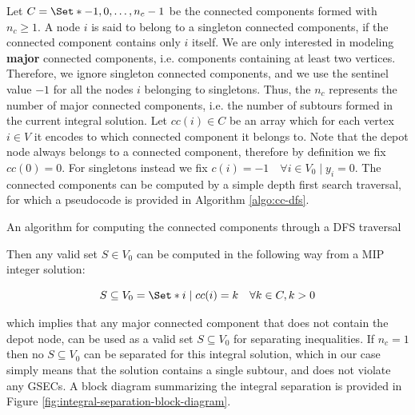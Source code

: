 Let $C = \Set*{-1, 0, \dots, n_c - 1}$ be the connected components formed with $n_c \ge 1$.
A node $i$ is said to belong to a singleton connected components, if the connected component contains only $i$ itself.
We are only interested in modeling \textbf{major} connected components, i.e. components containing at least two vertices.
Therefore, we ignore singleton connected components, and we use the sentinel value $-1$ for all the nodes $i$ belonging to singletons.
Thus, the $n_c$ represents the number of major connected components, i.e. the number of subtours formed in the current integral solution.
Let $cc(i) \in C$ be an array which for each vertex $i \in V$ it encodes to which connected component it belongs to.
Note that the depot node always belongs to a connected component, therefore by definition we fix $cc(0) = 0$.
For singletons instead we fix $c(i) = -1  \quad \forall i \in V_0 \mid y_i = 0$.
The connected components can be computed by a simple depth first search traversal, for which a pseudocode is provided in Algorithm \ref{algo:cc-dfs}.

\begin{algorithm}
	\caption{An algorithm for computing the connected components through a DFS traversal}
	
	\label{algo:cc-dfs}
\end{algorithm}

Then any valid set $S \in V_0$ can be computed in the following way from a MIP integer solution:

\begin{equation}
	S \subseteq V_0 = \Set* {i \mid cc(i) = k}   \quad \forall k \in C, k > 0
\end{equation}

which implies that any major connected component that does not contain the depot node, can be used as a valid set $S \subseteq V_0$ for separating inequalities.
If $n_c = 1$ then no $S \subseteq V_0$ can be separated for this integral solution, which in our case simply means that the solution contains a single subtour, and does not violate any GSECs.
A block diagram summarizing the integral separation is provided in Figure \ref{fig:integral-separation-block-diagram}.

